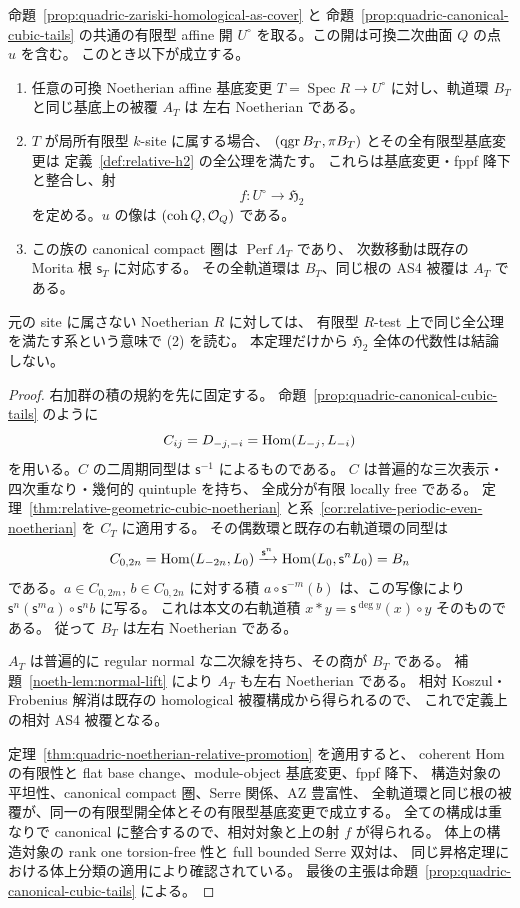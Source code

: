 \begin{theorem}[可換二次曲面の有限型相対実現]
\label{thm:quadric-finite-type-effectivity}
命題~\ref{prop:quadric-zariski-homological-as-cover} と
命題~\ref{prop:quadric-canonical-cubic-tails} の共通の有限型 affine 開
$U^\circ$ を取る。この開は可換二次曲面 $Q$ の点 $u$ を含む。
このとき以下が成立する。
\begin{enumerate}
\item 任意の可換 Noetherian affine 基底変更
$T=\operatorname{Spec}R\to U^\circ$ に対し、軌道環 $B_T$ と同じ基底上の被覆 $A_T$ は
左右 Noetherian である。
\item $T$ が局所有限型 $k$-site に属する場合、
$(\operatorname{qgr} B_T,\pi B_T)$ とその全有限型基底変更は
定義~\ref{def:relative-h2} の全公理を満たす。
これらは基底変更・fppf 降下と整合し、射
\[
 f:U^\circ\longrightarrow\mathfrak H_2
\]
を定める。$u$ の像は $(\operatorname{coh} Q,\mathcal O_Q)$ である。
\item この族の canonical compact 圏は $\operatorname{Perf}\Lambda_T$ であり、
次数移動は既存の Morita 根 $\mathsf s_T$ に対応する。
その全軌道環は $B_T$、同じ根の AS4 被覆は $A_T$ である。
\end{enumerate}
元の site に属さない Noetherian $R$ に対しては、
有限型 $R$-test 上で同じ全公理を満たす系という意味で (2) を読む。
本定理だけから $\mathfrak H_2$ 全体の代数性は結論しない。
\end{theorem}

\begin{proof}
右加群の積の規約を先に固定する。
命題~\ref{prop:quadric-canonical-cubic-tails} のように
\[
 C_{ij}=D_{-j,-i}
       =\operatorname{Hom}(L_{-j},L_{-i})
\]
を用いる。$C$ の二周期同型は $\mathsf s^{-1}$ によるものである。
$C$ は普遍的な三次表示・四次重なり・幾何的 quintuple を持ち、
全成分が有限 locally free である。
定理~\ref{thm:relative-geometric-cubic-noetherian} と系~\ref{cor:relative-periodic-even-noetherian} を $C_T$ に適用する。
その偶数環と既存の右軌道環の同型は
\[
 C_{0,2n}=\operatorname{Hom}(L_{-2n},L_0)
 \xrightarrow{\mathsf s^n}
 \operatorname{Hom}(L_0,\mathsf s^nL_0)=B_n
\]
である。$a\in C_{0,2m}$, $b\in C_{0,2n}$ に対する積
$a\circ\mathsf s^{-m}(b)$ は、この写像により
$\mathsf s^n(\mathsf s^m a)\circ\mathsf s^n b$ に写る。
これは本文の右軌道積 $x*y=\mathsf s^{\deg y}(x)\circ y$ そのものである。
従って $B_T$ は左右 Noetherian である。

$A_T$ は普遍的に regular normal な二次線を持ち、その商が $B_T$ である。
補題~\ref{noeth-lem:normal-lift} により $A_T$ も左右 Noetherian である。
相対 Koszul・Frobenius 解消は既存の homological 被覆構成から得られるので、
これで定義上の相対 AS4 被覆となる。

定理~\ref{thm:quadric-noetherian-relative-promotion} を適用すると、
coherent Hom の有限性と flat base change、module-object 基底変更、fppf 降下、
構造対象の平坦性、canonical compact 圏、Serre 関係、AZ 豊富性、
全軌道環と同じ根の被覆が、同一の有限型開全体とその有限型基底変更で成立する。
全ての構成は重なりで canonical に整合するので、相対対象と上の射 $f$ が得られる。
体上の構造対象の rank one torsion-free 性と full bounded Serre 双対は、
同じ昇格定理における体上分類の適用により確認されている。
最後の主張は命題~\ref{prop:quadric-canonical-cubic-tails} による。
\end{proof}
